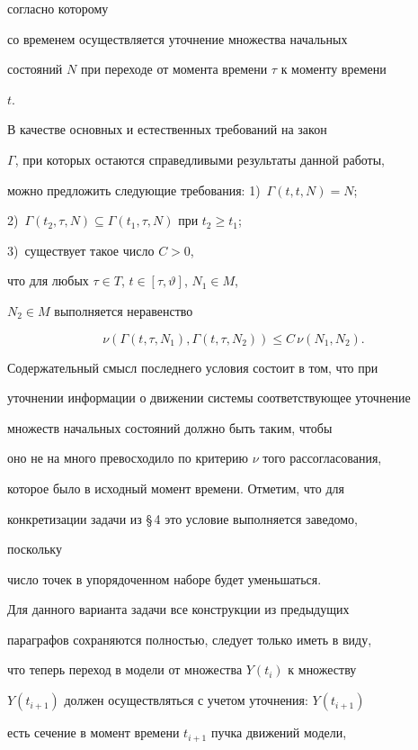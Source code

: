 согласно которому 


со временем осуществляется уточнение множества начальных 


состояний $N$ при переходе от момента времени $\tau$ к моменту времени 


$t$. 


В качестве основных и естественных требований на закон 


$\Gamma$, при которых остаются справедливыми результаты данной работы, 


можно предложить следующие требования: 1)~$\Gamma(t,t,N)=N$; 


2)~$\Gamma(t_2,\tau,N)\subseteq\Gamma(t_1,\tau,N)$ при $t_2\ge t_1$; 


3)~существует такое число $C>0$, 


что для любых $\tau\in T$, $t\in[\tau,\vartheta]$, $N_1\in M$, 


$N_2\in M$ выполняется неравенство 


$$ 


\nu(\Gamma(t,\tau,N_1),\Gamma(t,\tau,N_2))\le C\,\nu 


(N_1,N_2). 


$$ 


Содержательный смысл последнего условия состоит в том, что при 


уточнении информации о движении системы соответствующее уточнение 


множеств начальных состояний должно быть таким, чтобы 


оно не на много превосходило по критерию $\nu$ того рассогласования, 


которое было в исходный момент времени. Отметим, что для 


конкретизации задачи из \S\,4 это условие выполняется заведомо, 


поскольку 


число точек в упорядоченном наборе будет уменьшаться. 


 


Для данного варианта задачи все конструкции из предыдущих 


параграфов сохраняются полностью, следует только иметь в виду, 


что теперь переход в модели от множества $Y(t_i)$ к множеству 


$Y(t_{i+1})$ должен осуществляться с учетом уточнения: $Y(t_{i+1})$ 


есть сечение в момент времени $t_{i+1}$ пучка движений модели, 


